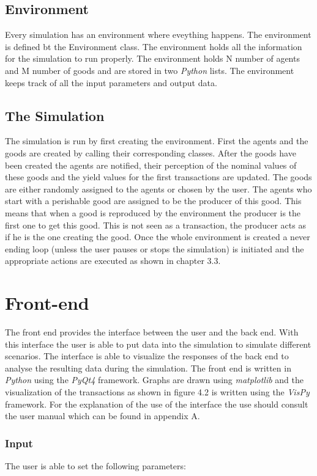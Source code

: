 \documentclass[twoside,openright]{uva-bachelor-thesis}
\begin{document}
\subsection{Environment}
Every simulation has an environment where eveything happens. The environment is defined bt the Environment class. The environment holds all the information for the simulation to run properly. The environment holds N number of agents and M number of goods and are stored in two \textit{Python} lists. The environment keeps track of all the input parameters and output data.

\subsection{The Simulation}
The simulation is run by first creating the environment. First the agents and the goods are created by calling their corresponding classes. After the goods have been created the agents are notified, their perception of the nominal values of these goods and the yield values for the first transactions are updated. The goods are either randomly assigned to the agents or chosen by the user. The agents who start with a perishable good are assigned to be the producer of this good. This means that when a good is reproduced by the environment the producer is the first one to get this good. This is not seen as a transaction, the producer acts as if he is the one creating the good. Once the whole environment is created a never ending loop (unless the user pauses or stops the simulation) is initiated and the appropriate actions are executed as shown in chapter 3.3.


\section{Front-end}
The front end provides the interface between the user and the back end. With this interface the user is able to put data into the simulation to simulate different scenarios. The interface is able to visualize the responses of the back end to analyse the resulting data during the simulation. The front end is written in \textit{Python} using the \textit{PyQt4} framework. Graphs are drawn using \textit{matplotlib} and the visualization of the transactions as shown in figure 4.2 is written using the \textit{VisPy} framework. For the explanation of the use of the interface the use should consult the user manual which can be found in appendix A.

\subsubsection{Input}
The user is able to set the following parameters:
\end{document}
